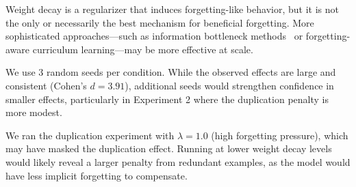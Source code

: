  Weight decay is a regularizer that induces forgetting-like behavior, but it is not the only or necessarily the best mechanism for beneficial forgetting. More sophisticated approaches---such as information bottleneck methods~\cite{wang2025breaking} or forgetting-aware curriculum learning---may be more effective at scale.

 We use 3 random seeds per condition. While the observed effects are large and consistent (Cohen's $d = 3.91$), additional seeds would strengthen confidence in smaller effects, particularly in Experiment 2 where the duplication penalty is more modest.

 We ran the duplication experiment with $\lambda = 1.0$ (high forgetting pressure), which may have masked the duplication effect. Running at lower weight decay levels would likely reveal a larger penalty from redundant examples, as the model would have less implicit forgetting to compensate.
